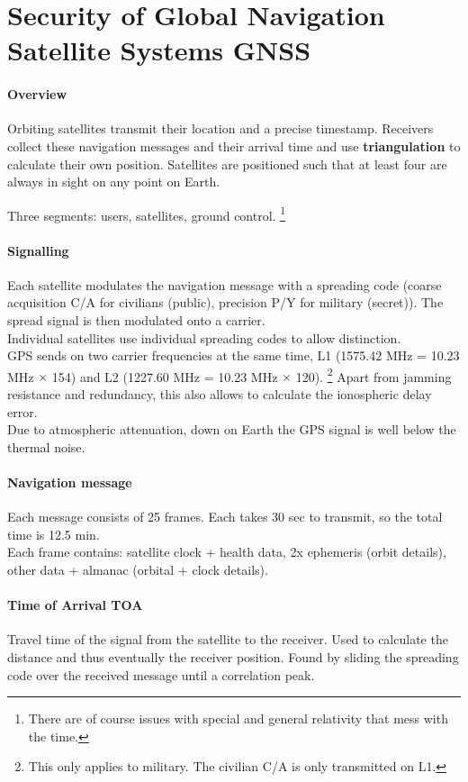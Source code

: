 \section{Security of Global Navigation Satellite Systems GNSS}

\paragraph{Overview}
Orbiting satellites transmit their location and a precise timestamp.
Receivers collect these navigation messages and their arrival time and use \textbf{triangulation} to calculate their own position.
Satellites are positioned such that at least four are always in sight on any point on Earth.

Three segments: users, satellites, ground control.%
\footnote{There are of course issues with special and general relativity that mess with the time.}

\paragraph{Signalling}
Each satellite modulates the navigation message with a spreading code (coarse acquisition C/A for civilians (public), precision P/Y for military (secret)).
The spread signal is then modulated onto a carrier.
\\
Individual satellites use individual spreading codes to allow distinction.
\\
GPS sends on two carrier frequencies at the same time, L1 (1575.42 MHz = 10.23 MHz $\times$ 154) and L2 (1227.60 MHz = 10.23 MHz $\times$ 120).%
\footnote{This only applies to military. The civilian C/A is only transmitted on L1.}
Apart from jamming resistance and redundancy, this also allows to calculate the ionospheric delay error.
\\
Due to atmospheric attenuation, down on Earth the GPS signal is well below the thermal noise.

\paragraph{Navigation message}
Each message consists of 25 frames.
Each takes 30 sec to transmit, so the total time is 12.5 min.
\\
Each frame contains: satellite clock + health data, 2x ephemeris (orbit details), other data + almanac (orbital + clock details).

\paragraph{Time of Arrival TOA}
Travel time of the signal from the satellite to the receiver.
Used to calculate the distance and thus eventually the receiver position.
Found by sliding the spreading code over the received message until a correlation peak.

